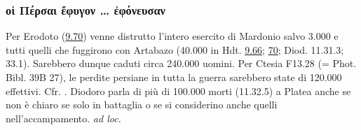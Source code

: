 {    \subsubsection{\textgreek{οἱ Πέρσαι ἔφυγον … ἐφόνευσαν}} 
    Per Erodoto (\href{http://data.perseus.org/citations/urn:cts:greekLit:tlg0016.tlg001.perseus-grc1:9.70}{9.70}) venne distrutto  l'intero esercito di Mardonio salvo 3.000 e tutti quelli che fuggirono con Artabazo (40.000 in Hdt. \href{http://data.perseus.org/citations/urn:cts:greekLit:tlg0016.tlg001.perseus-grc1:9.66}{9.66}; \href{http://data.perseus.org/citations/urn:cts:greekLit:tlg0016.tlg001.perseus-grc1:9.70}{70}; Diod. 11.31.3; 33.1). Sarebbero dunque caduti circa 240.000 uomini. Per Ctesia F13.28 (= Phot. Bibl. 39B 27), le perdite persiane in tutta la guerra sarebbero state di 120.000 effettivi. Cfr. \cite[XCIII-XCV]{Lenfant2004}.  Diodoro parla di più di 100.000 morti (11.32.5) a Platea anche se non è chiaro se solo in battaglia o se si considerino anche quelli nell'accampamento. \cite{Pownall2011} \emph{ad loc.}
}
